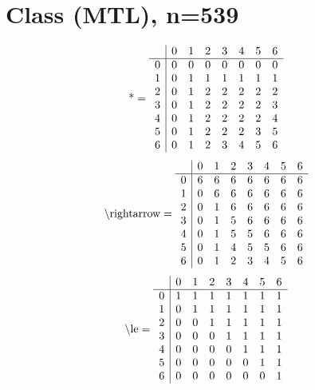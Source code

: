 \documentclass[11pt]{article}
\begin{document}
\section{Class (MTL), n=539}
\[\text{*} = 
\begin{array}{r | r r r r r r r}
 & 0 & 1 & 2 & 3 & 4 & 5 & 6 \\ \hline
0 & 0 & 0 & 0 & 0 & 0 & 0 & 0 \\
1 & 0 & 1 & 1 & 1 & 1 & 1 & 1 \\
2 & 0 & 1 & 2 & 2 & 2 & 2 & 2 \\
3 & 0 & 1 & 2 & 2 & 2 & 2 & 3 \\
4 & 0 & 1 & 2 & 2 & 2 & 2 & 4 \\
5 & 0 & 1 & 2 & 2 & 2 & 3 & 5 \\
6 & 0 & 1 & 2 & 3 & 4 & 5 & 6 \\
\end{array}
\]
\[\text{\textbackslash rightarrow} = 
\begin{array}{r | r r r r r r r}
 & 0 & 1 & 2 & 3 & 4 & 5 & 6 \\ \hline
0 & 6 & 6 & 6 & 6 & 6 & 6 & 6 \\
1 & 0 & 6 & 6 & 6 & 6 & 6 & 6 \\
2 & 0 & 1 & 6 & 6 & 6 & 6 & 6 \\
3 & 0 & 1 & 5 & 6 & 6 & 6 & 6 \\
4 & 0 & 1 & 5 & 5 & 6 & 6 & 6 \\
5 & 0 & 1 & 4 & 5 & 5 & 6 & 6 \\
6 & 0 & 1 & 2 & 3 & 4 & 5 & 6 \\
\end{array}
\]
\[\text{\textbackslash le} = 
\begin{array}{r | r r r r r r r}
 & 0 & 1 & 2 & 3 & 4 & 5 & 6 \\ \hline
0 & 1 & 1 & 1 & 1 & 1 & 1 & 1 \\
1 & 0 & 1 & 1 & 1 & 1 & 1 & 1 \\
2 & 0 & 0 & 1 & 1 & 1 & 1 & 1 \\
3 & 0 & 0 & 0 & 1 & 1 & 1 & 1 \\
4 & 0 & 0 & 0 & 0 & 1 & 1 & 1 \\
5 & 0 & 0 & 0 & 0 & 0 & 1 & 1 \\
6 & 0 & 0 & 0 & 0 & 0 & 0 & 1 \\
\end{array}
\]
\end{document}
